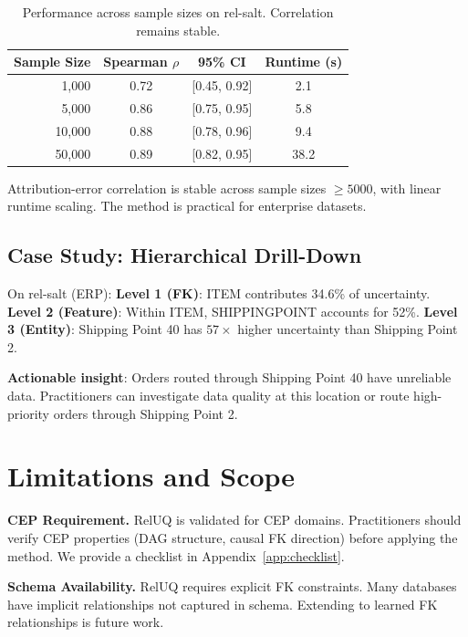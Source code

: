 \documentclass{article}
\begin{document}
\begin{table}[t]
\centering
\caption{Performance across sample sizes on rel-salt. Correlation remains stable.}
\label{tab:scale}
\begin{tabular}{rccc}
\toprule
Sample Size & Spearman $\rho$ & 95\% CI & Runtime (s) \\
\midrule
1,000 & 0.72 & [0.45, 0.92] & 2.1 \\
5,000 & 0.86 & [0.75, 0.95] & 5.8 \\
10,000 & 0.88 & [0.78, 0.96] & 9.4 \\
50,000 & 0.89 & [0.82, 0.95] & 38.2 \\
\bottomrule
\end{tabular}
\end{table}

Attribution-error correlation is stable across sample sizes $\geq 5000$, with linear
runtime scaling. The method is practical for enterprise datasets.

\subsection{Case Study: Hierarchical Drill-Down}

On rel-salt (ERP):
\textbf{Level 1 (FK)}: ITEM contributes 34.6\% of uncertainty.
\textbf{Level 2 (Feature)}: Within ITEM, SHIPPINGPOINT accounts for 52\%.
\textbf{Level 3 (Entity)}: Shipping Point 40 has $57\times$ higher uncertainty than
Shipping Point 2.

\textbf{Actionable insight}: Orders routed through Shipping Point 40 have unreliable
data. Practitioners can investigate data quality at this location or route
high-priority orders through Shipping Point 2.

\section{Limitations and Scope}
\label{sec:limitations}

\textbf{CEP Requirement.}
RelUQ is validated for CEP domains. Practitioners should verify CEP properties
(DAG structure, causal FK direction) before applying the method. We provide a
checklist in Appendix~\ref{app:checklist}.

\textbf{Schema Availability.}
RelUQ requires explicit FK constraints. Many databases have implicit relationships
not captured in schema. Extending to learned FK relationships is future work.
\end{document}
